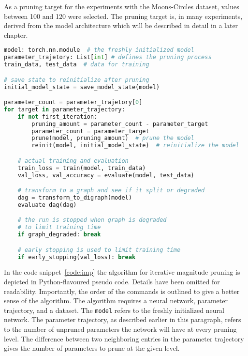As a pruning target for the experiments with the Moons-Circles dataset, values between 100 and 120 were selected.
The pruning target is, in many experiments, derived from the model architecture which will be described in detail in a later chapter.

\begin{minipage}{\linewidth}
\begin{lstlisting}[language=Python,caption={Iterative magnitude pruning with parameter resetting; pseudo code},captionpos=b, label={code:imp}]
model: torch.nn.module  # the freshly initialized model 
parameter_trajetory: List[int] # defines the pruning process
train_data, test_data  # data for training

# save state to reinitialize after pruning
initial_model_state = save_model_state(model)

parameter_count = parameter_trajetory[0]
for target in parameter_trajectory:
    if not first_iteration:
        pruning_amount = parameter_count - parameter_target
        parameter_count = parameter_target
        prune(model, pruning_amount)  # prune the model 
        reinit(model, initial_model_state)  # reinitialize the model

    # actual training and evaluation
    train_loss = train(model, train_data)
    val_loss, val_accuracy = evaluate(model, test_data)

    # transform to a graph and see if it split or degraded
    dag = transform_to_digraph(model)
    evaluate_dag(dag)

    # the run is stopped when graph is degraded 
    # to limit training time
    if graph_degraded: break

    # early stopping is used to limit training time
    if early_stopping(val_loss): break
\end{lstlisting}
\end{minipage}

In the code snippet~\ref{code:imp} the algorithm for iterative magnitude pruning is depicted in Python-flavoured pseudo code.
Details have been omitted for readability.
Importantly, the order of the commands is outlined to give a better sense of the algorithm.
The algorithm requires a neural network, parameter trajectory, and a dataset.
The \lstinline{model} refers to the freshly initialized neural network.
The parameter trajectory, as described earlier in this paragraph, refers to the number of unpruned parameters the network will have at every pruning level.
The difference between two neighboring entries in the parameter trajectory gives the number of parameters to prune at the given level.

